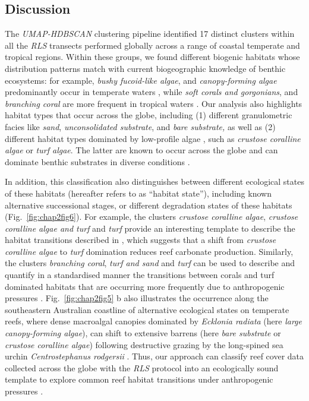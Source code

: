 \begin{refsection}
\clearpage

\hypertarget{discussion-chapt2}{%
\section{Discussion}\label{discussion-chapt2}}

The \emph{UMAP-HDBSCAN} clustering pipeline identified 17 distinct
clusters within all the \emph{RLS} transects performed globally across a
range of coastal temperate and tropical regions. Within these groups, we
found different biogenic habitats whose distribution patterns match with
current biogeographic knowledge of benthic ecosystems: for example,
\emph{bushy fucoid-like algae}, and \emph{canopy-forming algae}
predominantly occur in temperate waters \autocites[
]{Assis_2020}{Jayathilake_2020}, while \emph{soft corals and
gorgonians}, and \emph{branching coral} are more frequent in tropical
waters \autocites[ ]{Jones_2019}{Wirabuana_2019}. Our analysis also
highlights habitat types that occur across the globe, including (1)
different granulometric facies like \emph{sand}, \emph{unconsolidated
substrate}, and \emph{bare substrate,} as well as (2) different habitat
types dominated by low-profile algae , such as \emph{crustose coralline
algae} or \emph{turf algae}. The latter are known to occur across the
globe and can dominate benthic substrates in diverse conditions
\autocites[ ]{Connell_2014}{Liu_2018}.

In addition, this classification also distinguishes between different
ecological states of these habitats (hereafter refers to as ``habitat
state''), including known alternative successional stages, or different
degradation states of these habitats (Fig.~\ref{fig:chap2fig6}). For
example, the clusters \emph{crustose coralline algae}, \emph{crustose
coralline algae and turf} and \emph{turf} provide an interesting
template to describe the habitat transitions described in
\textcite{Cornwall_2023}, which suggests that a shift from
\emph{crustose coralline algae} to \emph{turf} domination reduces reef
carbonate production. Similarly, the clusters \emph{branching coral},
\emph{turf and sand} and \emph{turf} can be used to describe and
quantify in a standardised manner the transitions between corals and
turf dominated habitats that are occurring more frequently due to
anthropogenic pressures \autocite{Jouffray_2015}.
Fig.~\ref{fig:chap2fig5} b also illustrates the occurrence along the
southeastern Australian coastline of alternative ecological states on
temperate reefs, where dense macroalgal canopies dominated by
\emph{Ecklonia radiata} (here \emph{large canopy-forming algae}), can
shift to extensive barrens (here \emph{bare substrate} or \emph{crustose
coralline algae}) following destructive grazing by the long-spined sea
urchin \emph{Centrostephanus rodgersii} \autocite{Ling_2009}. Thus, our
approach can classify reef cover data collected across the globe with
the \emph{RLS} protocol into an ecologically sound template to explore
common reef habitat transitions under anthropogenic pressures
\autocite{Donovan_2018}.


\end{refsection}
